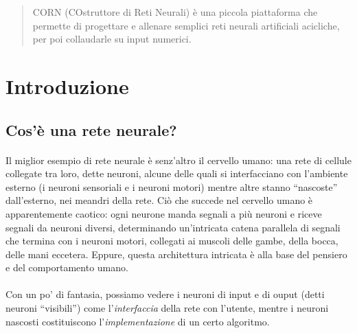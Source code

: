 \documentclass[12pt]{article}
\begin{document}
\maketitle




\begin{abstract}
\textsc{CORN} (COstruttore di Reti Neurali) è una piccola piattaforma che permette di progettare e allenare semplici reti neurali artificiali acicliche, per poi collaudarle su input numerici.
\end{abstract}




\section{Introduzione}

\subsection{Cos'è una rete neurale?}

\paragraph{}
Il miglior esempio di rete neurale è senz'altro il cervello umano: una rete di cellule collegate tra loro, dette neuroni, alcune delle quali si interfacciano con l'ambiente esterno (i neuroni sensoriali e i neuroni motori) mentre altre stanno “nascoste” dall'esterno, nei meandri della rete. Ciò che succede nel cervello umano è apparentemente caotico: ogni neurone manda segnali a più neuroni e riceve segnali da neuroni diversi, determinando un'intricata catena parallela di segnali che termina con i neuroni motori, collegati ai muscoli delle gambe, della bocca, delle mani eccetera. Eppure, questa architettura intricata è alla base del pensiero e del comportamento umano.

\paragraph{}
Con un po' di fantasia, possiamo vedere i neuroni di input e di ouput (detti neuroni “visibili”) come l'\textit{interfaccia} della rete con l'utente, mentre i neuroni nascosti costituiscono l'\textit{implementazione} di un certo algoritmo.
\end{document}
